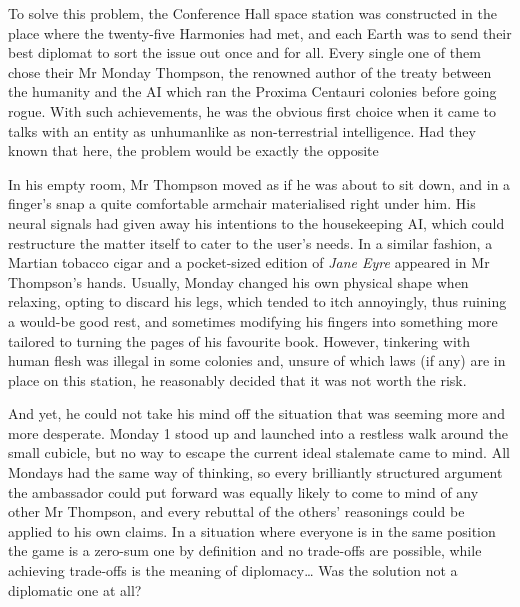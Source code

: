 To solve this problem, the Conference Hall space station was
constructed in the place where the twenty-five Harmonies had met,
and each Earth was to send their best diplomat to sort the issue out
once and for all. Every single one of them chose their Mr Monday
Thompson, the renowned author of the treaty between the humanity and
the AI which ran the Proxima Centauri colonies before going
rogue. With such achievements, he was the obvious first choice when it
came to talks with an entity as unhumanlike as non-terrestrial
intelligence. Had they known that here, the problem would be exactly
the opposite\textellipsis{}

In his empty room, Mr Thompson moved as if he was about to sit down,
and in a finger's snap a quite comfortable armchair materialised right
under him. His neural signals had given away his intentions to the
housekeeping AI, which could restructure the matter itself to cater to
the user's needs. In a similar fashion, a Martian tobacco cigar and a
pocket-sized edition of \textit{Jane Eyre} appeared in Mr Thompson's
hands. Usually, Monday changed his own physical shape when relaxing,
opting to discard his legs, which tended to itch annoyingly, thus
ruining a would-be good rest, and sometimes modifying his fingers into
something more tailored to turning the pages of his favourite
book. However, tinkering with human flesh was illegal in some colonies
and, unsure of which laws (if any) are in place on this station, he
reasonably decided that it was not worth the risk.

And yet, he could not take his mind off the situation that was seeming
more and more desperate. Monday 1 stood up and launched into a
restless walk around the small cubicle, but no way to escape the
current ideal stalemate came to mind. All Mondays had the same way of
thinking, so every brilliantly structured argument the ambassador
could put forward was equally likely to come to mind of any other Mr
Thompson, and every rebuttal of the others' reasonings could be
applied to his own claims. In a situation where everyone is in the
same position the game is a zero-sum one by definition and no
trade-offs are possible, while achieving trade-offs is the meaning of
diplomacy… Was the solution not a diplomatic one at all?

